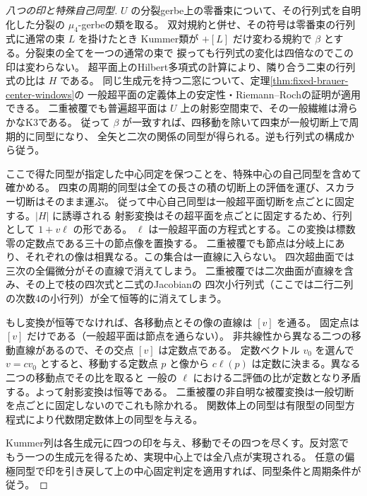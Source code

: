 \begin{proof}[八つの印と特殊自己同型]
$U$ の分裂gerbe上の零番束について、その行列式を自明化した分裂の $\mu_4$-gerbeの類を取る。
双対規約と併せ、その符号は零番束の行列式に通常の束 $L$ を掛けたとき
Kummer類が $+[L]$ だけ変わる規約で $\beta$ とする。分裂束の全てを一つの通常の束で
捩っても行列式の変化は四倍なのでこの印は変わらない。
超平面上のHilbert多項式の計算により、隣り合う二束の行列式の比は $H$ である。
同じ生成元を持つ二窓について、定理\ref{thm:fixed-brauer-center-windows}の
一般超平面の定義体上の安定性・Riemann--Rochの証明が適用できる。
二重被覆でも普遍超平面は $U$ 上の射影空間束で、その一般繊維は滑らかなK3である。
従って $\beta$ が一致すれば、四移動を除いて四束が一般切断上で周期的に同型になり、
全矢と二次の関係の同型が得られる。逆も行列式の構成から従う。

ここで得た同型が指定した中心同定を保つことを、特殊中心の自己同型を含めて確かめる。
四束の周期的同型は全ての長さの積の切断上の評価を運び、スカラー切断はそのまま運ぶ。
従って中心自己同型は一般超平面切断を点ごとに固定する。$|H|$ に誘導される
射影変換はその超平面を点ごとに固定するため、行列として $1+v\ell$ の形である。
$\ell$ は一般超平面の方程式とする。この変換は標数零の定数点である三十の節点像を置換する。
二重被覆でも節点は分岐上にあり、それぞれの像は相異なる。この集合は一直線に入らない。
四次超曲面では三次の全偏微分がその直線で消えてしまう。
二重被覆では二次曲面が直線を含み、その上で枝の四次式と二式のJacobianの
四次小行列式（ここでは二行二列の次数4の小行列）が全て恒等的に消えてしまう。

もし変換が恒等でなければ、各移動点とその像の直線は $[v]$ を通る。
固定点は $[v]$ だけである（一般超平面は節点を通らない）。
非共線性から異なる二つの移動直線があるので、その交点 $[v]$ は定数点である。
定数ベクトル $v_0$ を選んで $v=cv_0$ とすると、移動する定数点 $p$ と像から
$c\ell(p)$ は定数に決まる。異なる二つの移動点でその比を取ると
一般の $\ell$ における二評価の比が定数となり矛盾する。よって射影変換は恒等である。
二重被覆の非自明な被覆変換は一般切断を点ごとに固定しないのでこれも除かれる。
関数体上の同型は有限型の同型方程式により代数閉定数体上の同型を与える。

Kummer列は各生成元に四つの印を与え、移動でその四つを尽くす。反対窓で
もう一つの生成元を得るため、実現中心上では全八点が実現される。
任意の偏極同型で印を引き戻して上の中心固定判定を適用すれば、同型条件と周期条件が従う。
\end{proof}

